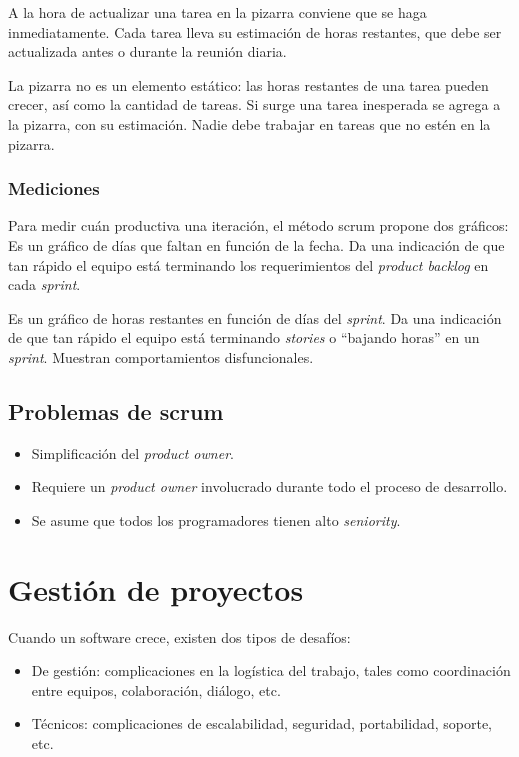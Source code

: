 \documentclass[]{article}
\begin{document}
A la hora de actualizar una tarea en la pizarra conviene que se haga inmediatamente. Cada tarea lleva su estimación de horas restantes, que debe ser actualizada antes o durante la reunión diaria.

La pizarra no es un elemento estático: las horas restantes de una tarea pueden crecer, así como la cantidad de tareas. Si surge una tarea inesperada se agrega a la pizarra, con su estimación. Nadie debe trabajar en tareas que no estén en la pizarra.

\subsubsection{Mediciones}
Para medir cuán productiva una iteración, el método scrum propone dos gráficos:
Es un gráfico de días que faltan en función de la fecha. Da una indicación de que tan rápido el equipo está terminando los requerimientos del \emph{product backlog} en cada \emph{sprint}.

Es un gráfico de horas restantes en función de días del \emph{sprint}. Da una indicación de que tan rápido el equipo está terminando \emph{stories} o ``bajando horas'' en un \emph{sprint}. Muestran comportamientos disfuncionales.

\subsection{Problemas de scrum}
\begin{itemize}
	\item Simplificación del \emph{product owner}.
	\item Requiere un \emph{product owner} involucrado durante todo el proceso de desarrollo.
	\item Se asume que todos los programadores tienen alto \emph{seniority}.
\end{itemize}

\newpage

\section{Gestión de proyectos}
Cuando un software crece, existen dos tipos de desafíos:
\begin{itemize}
	\item De gestión: complicaciones en la logística del trabajo, tales como coordinación entre equipos, colaboración, diálogo, etc.
	\item Técnicos: complicaciones de escalabilidad, seguridad, portabilidad, soporte, etc.
\end{itemize}
\end{document}
